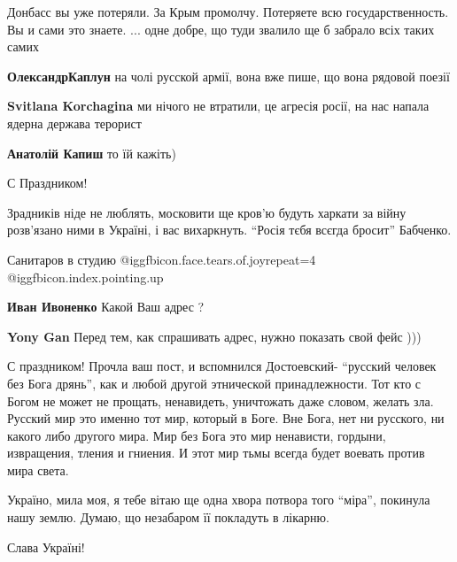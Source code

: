 \begin{itemize}
\begin{itemize}
Донбасс вы уже потеряли. За Крым промолчу. Потеряете всю государственность. Вы и сами это знаете.
...
одне добре, що туди звалило
ще б забрало всіх таких самих

\textbf{ОлександрКаплун} на чолі русской армії, вона вже пише, що вона рядовой поезії

\textbf{Svitlana Korchagina} ми нічого не втратили, це агресія росії, на нас напала ядерна держава терорист

\textbf{Анатолій Капиш} то їй кажіть)

\end{itemize} %


С Праздником!


Зрадників ніде не люблять, московити ще кров'ю будуть харкати за війну розв'язано ними в Україні, і вас вихаркнуть.
\enquote{Росія тєбя всєгда бросит} Бабченко.

Санитаров в студию  @igg{fbicon.face.tears.of.joy}{repeat=4} @igg{fbicon.index.pointing.up}

\begin{itemize} %
\textbf{Иван Ивоненко} Какой Ваш адрес ?

\textbf{Yony Gan} Перед тем, как спрашивать адрес, нужно показать свой фейс )))
\end{itemize} %


С праздником! Прочла ваш пост, и вспомнился Достоевский- \enquote{русский человек без
Бога дрянь}, как и любой другой этнической принадлежности. Тот кто с Богом не
может не прощать, ненавидеть, уничтожать даже словом, желать зла. Русский мир
это именно тот мир, который в Боге. Вне Бога, нет ни русского, ни какого либо
другого мира. Мир без Бога это мир ненависти, гордыни, извращения, тления и
гниения. И этот мир тьмы всегда будет воевать против мира света.

Україно, мила моя, я тебе вітаю ще одна хвора потвора того \enquote{міра}, покинула нашу землю.
Думаю, що незабаром її покладуть в лікарню.

Слава Україні!



\end{itemize}
